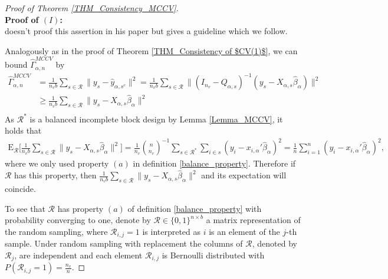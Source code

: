 \documentclass[Research_Module_ES.tex]{subfiles}
\begin{document}
\begin{proof}[Proof of Theorem \ref{THM_Consistency_MCCV}]~\\
	\textbf{Proof of $(I)$:} \\
	\cite{shao} doesn't proof this assertion in his paper but gives a guideline which we follow.
	
	Analogously as in the proof of Theorem \ref{THM_Consistency of $CV(1)$}, we can bound $\hat{\Gamma}_{\alpha,n}^{MCCV}$ by
	\begin{align*}
	\hat{\Gamma}_{\alpha,n}^{MCCV}&= \frac{1}{n_vb}\sum_{s\in \mathcal{R}}\lVert y_s-\hat{y}_{\alpha,s^c}\rVert^2
	= \frac{1}{n_vb}\sum_{s\in \mathcal{R}}\lVert (I_{n_v}-Q_{\alpha,s})^{-1}(y_s-X_{\alpha,s}\hat{\beta}_\alpha)\rVert^2\\
	&\ge \frac{1}{n_vb}\sum_{s\in \mathcal{R}}\lVert y_s-X_{\alpha,s}\hat{\beta}_\alpha\rVert^2\\
	\end{align*}
	As $\mathcal{R}^\ast$ is a balanced incomplete block design by Lemma \ref{Lemma_MCCV}, it holds that
	\begin{align*}
	\mathrm{E}_\mathcal{R} \biggl[\frac{1}{n_vb}\sum_{s\in \mathcal{R}}\lVert y_s-X_{\alpha,s}\hat{\beta}_\alpha\rVert^2 \biggr] 
	= \frac{1}{n_v}\binom{n}{n_v}^{-1}\sum_{s\in \mathcal{R}^\ast}\sum_{i\in s}(y_i-x_{i,\alpha}'\hat{\beta}_\alpha)^2
	= \frac{1}{n}\sum_{i=1}^n(y_i-x_{i,\alpha}'\hat{\beta}_\alpha)^2,
	\end{align*}
	where we only used property $(a)$ in definition \ref{balance_property}.
	Therefore if $\mathcal{R}$ has this property, then $\frac{1}{n_vb}\sum_{s\in \mathcal{R}}\lVert y_s-X_{\alpha,s}\hat{\beta}_\alpha\rVert^2$ and its expectation will coincide. 
	
	To see that $\mathcal{R}$ has property $(a)$ of definition \ref{balance_property} with probability converging to one, denote by $\mathcal{R}\in \{ 0,1\}^{n\times b}$ a matrix representation of the random sampling, where $\mathcal{R}_{i,j}=1$ is interpreted as $i$ is an element of the $j$-th sample.
	Under random sampling with replacement the columns of $\mathcal{R}$, denoted by $\mathcal{R}_j$, are independent and each element $\mathcal{R}_{i,j}$ is Bernoulli distributed with $P(\mathcal{R}_{i,j}=1)=\frac{n_v}{n}$.
	

\end{proof}
\end{document}
